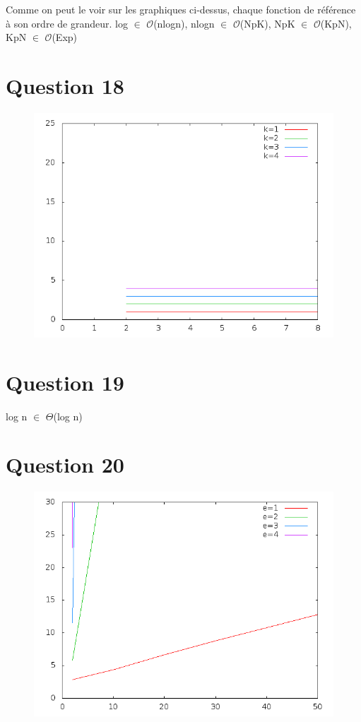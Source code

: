 \documentclass[a4paper,12pt]{report}
\begin{document}
Comme on peut le voir sur les graphiques ci-dessus, chaque fonction de référence à son ordre de grandeur.
log $\in$ $\mathcal{O}$(nlogn), nlogn $\in$ $\mathcal{O}$(NpK), NpK $\in$ $\mathcal{O}$(KpN), KpN $\in$ $\mathcal{O}$(Exp)

\newpage

\section*{Question 18}
\begin{figure}[!ht]
	\center
	\includegraphics[scale=0.4]{q18.png}
\end{figure}

\section*{Question 19}
log n $\in$ $\Theta$(log n)
\newpage

\section*{Question 20}
\begin{figure}[!ht]
	\center
	\includegraphics[scale=0.4]{q20.png}
\end{figure}
\end{document}
